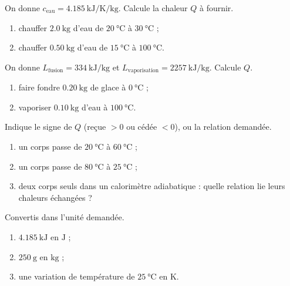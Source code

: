 \documentclass[11pt,a4paper]{article}
\begin{document}
\begin{exo}[chaleur sensible $Q=mc\Delta T$]
On donne $c_{\text{eau}}=\qty{4.185}{\kilo\joule\per\kelvin\per\kilogram}$. Calcule la chaleur $Q$ à fournir.
\begin{enumerate}[label=\alph*)]
  \item chauffer $\qty{2.0}{\kilogram}$ d'eau de $\qty{20}{\celsius}$ à $\qty{30}{\celsius}$ ;
  \item chauffer $\qty{0.50}{\kilogram}$ d'eau de $\qty{15}{\celsius}$ à $\qty{100}{\celsius}$.
\end{enumerate}
\end{exo}

\begin{exo}[chaleur latente $Q=mL$]
On donne $L_{\text{fusion}}=\qty{334}{\kilo\joule\per\kilogram}$ et $L_{\text{vaporisation}}=\qty{2257}{\kilo\joule\per\kilogram}$. Calcule $Q$.
\begin{enumerate}[label=\alph*)]
  \item faire fondre $\qty{0.20}{\kilogram}$ de glace à $\qty{0}{\celsius}$ ;
  \item vaporiser $\qty{0.10}{\kilogram}$ d'eau à $\qty{100}{\celsius}$.
\end{enumerate}
\end{exo}

\begin{exo}
Indique le signe de $Q$ (reçue $>0$ ou cédée $<0$), ou la relation demandée.
\begin{enumerate}[label=\alph*)]
  \item un corps passe de $\qty{20}{\celsius}$ à $\qty{60}{\celsius}$ ;
  \item un corps passe de $\qty{80}{\celsius}$ à $\qty{25}{\celsius}$ ;
  \item deux corps seuls dans un calorimètre adiabatique : quelle relation lie leurs chaleurs échangées ?
\end{enumerate}
\end{exo}

\begin{exo}
Convertis dans l'unité demandée.
\begin{enumerate}[label=\alph*)]
  \item $\qty{4.185}{\kilo\joule}$ en $\si{\joule}$ ;
  \item $\qty{250}{\gram}$ en $\si{\kilogram}$ ;
  \item une variation de température de $\qty{25}{\celsius}$ en $\si{\kelvin}$.
\end{enumerate}
\end{exo}
\end{document}
